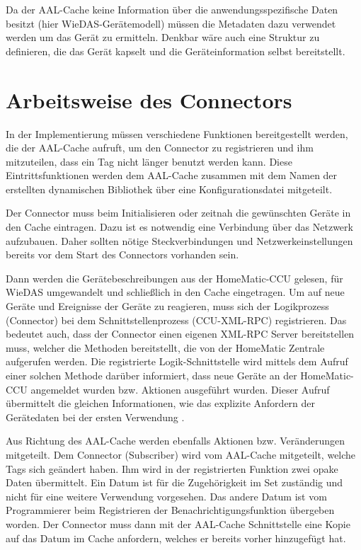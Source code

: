 Da der AAL-Cache keine Information über die anwendungsspezifische Daten besitzt (hier WieDAS-Gerätemodell)
müssen die Metadaten dazu verwendet werden um das Gerät zu ermitteln.
Denkbar wäre auch eine Struktur zu definieren, die das Gerät kapselt und die Geräteinformation
selbst bereitstellt.

\section{Arbeitsweise des Connectors}
\label{ana_connector}

In der Implementierung müssen verschiedene Funktionen bereitgestellt werden, die der AAL-Cache
aufruft, um den Connector zu registrieren und ihm mitzuteilen, dass ein Tag nicht länger
benutzt werden kann.
Diese Eintrittsfunktionen werden dem AAL-Cache zusammen mit dem Namen der erstellten dynamischen
Bibliothek über eine Konfigurationsdatei mitgeteilt.

Der Connector muss beim Initialisieren oder zeitnah die gewünschten Geräte in den Cache
eintragen.
Dazu ist es notwendig eine Verbindung über das Netzwerk aufzubauen.
Daher sollten nötige Steckverbindungen und Netzwerkeinstellungen bereits vor dem Start
des Connectors vorhanden sein.

Dann werden die Gerätebeschreibungen aus der HomeMatic-CCU gelesen, für WieDAS umgewandelt
und schließlich in den Cache eingetragen.
Um auf neue Geräte und Ereignisse der Geräte zu reagieren, muss sich der Logikprozess (Connector)
bei dem Schnittstellenprozess (CCU-XML-RPC) registrieren.
Das bedeutet auch, dass der Connector einen eigenen XML-RPC Server bereitstellen muss, welcher
die Methoden bereitstellt, die von der HomeMatic Zentrale aufgerufen werden.
Die registrierte Logik-Schnittstelle wird mittels dem Aufruf einer solchen Methode darüber
informiert, dass neue Geräte an der HomeMatic-CCU angemeldet wurden bzw. Aktionen ausgeführt
wurden.
Dieser Aufruf übermittelt die gleichen Informationen, wie das explizite Anfordern
der Gerätedaten bei der ersten Verwendung \cite{homematic_xmlrpc}.

Aus Richtung des AAL-Cache werden ebenfalls Aktionen bzw. Veränderungen mitgeteilt.
Dem Connector (Subscriber) wird vom AAL-Cache mitgeteilt, welche Tags sich geändert haben.
Ihm wird in der registrierten Funktion zwei opake Daten übermittelt.
Ein Datum ist für die Zugehörigkeit im Set zuständig und nicht für eine weitere Verwendung
vorgesehen.
Das andere Datum ist vom Programmierer beim Registrieren der Benachrichtigungsfunktion übergeben
worden.
Der Connector muss dann mit der AAL-Cache Schnittstelle eine Kopie auf das Datum im Cache
anfordern, welches er bereits vorher hinzugefügt hat.

